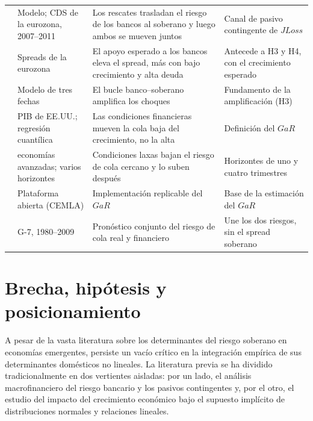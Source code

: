 \begin{table}[htbp]
\begin{tabular}{>{\raggedright\arraybackslash}p{}>{\raggedright\arraybackslash}p{}>{\raggedright\arraybackslash}p{}>{\raggedright\arraybackslash}p{}}
\addlinespace
\citet{AcharyaDrechslerSchnabl2014b} & Modelo; CDS de la eurozona, 2007--2011 & Los rescates trasladan el riesgo de los bancos al soberano y luego ambos se mueven juntos & Canal de pasivo contingente de $JLoss$ \\
\addlinespace
\citet{ModySandri2012} & Spreads de la eurozona & El apoyo esperado a los bancos eleva el spread, más con bajo crecimiento y alta deuda & Antecede a H3 y H4, con el crecimiento esperado \\
\addlinespace
\citet{FarhiTirole2018b} & Modelo de tres fechas & El bucle banco--soberano amplifica los choques & Fundamento de la amplificación (H3) \\
\addlinespace
\citet{ABG2019b} & PIB de EE.UU.; regresión cuantílica & Las condiciones financieras mueven la cola baja del crecimiento, no la alta & Definición del $GaR$ \\
\addlinespace
\citet{AdrianEtAl2022} & 11 economías avanzadas; varios horizontes & Condiciones laxas bajan el riesgo de cola cercano y lo suben después & Horizontes de uno y cuatro trimestres \\
\addlinespace
\citet{OssandonBusch2022} & Plataforma abierta (CEMLA) & Implementación replicable del $GaR$ & Base de la estimación del $GaR$ \\
\addlinespace
\citet{DeNicoloLucchetta2011} & G-7, 1980--2009 & Pronóstico conjunto del riesgo de cola real y financiero & Une los dos riesgos, sin el spread soberano \\
\bottomrule
\end{tabular}
\end{table}

\section{Brecha, hipótesis y posicionamiento}
\label{sec:sintesis-pilares}

A pesar de la vasta literatura sobre los determinantes del riesgo soberano en economías emergentes, persiste un vacío crítico en la integración empírica de sus determinantes domésticos no lineales. La literatura previa se ha dividido tradicionalmente en dos vertientes aisladas: por un lado, el análisis macrofinanciero del riesgo bancario y los pasivos contingentes y, por el otro, el estudio del impacto del crecimiento económico bajo el supuesto implícito de distribuciones normales y relaciones lineales.

